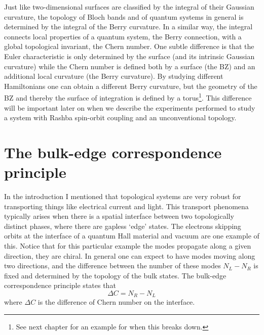 Just like two-dimensional surfaces are classified by the integral of their Gaussian curvature, the topology of Bloch bands and of quantum systems in general is determined by the integral of the Berry curvature. In a similar way, the integral connects local properties of a quantum system, the Berry connection, with a global topological invariant, the Chern number. One subtle difference is that the Euler characteristic is only determined by the surface (and its intrinsic Gaussian curvature) while the Chern number is defined both by a surface (the BZ) and an additional local curvature (the Berry curvature). By studying different Hamiltonians one can obtain a different Berry curvature, but the geometry of the BZ and thereby the surface of integration is defined by a torus\footnote{See next chapter for an example for when this breaks down.}. This difference will be important later on when we describe the experiments performed to study a system with Rashba spin-orbit coupling and an unconventional topology. %


\section{The bulk-edge correspondence principle}

In the introduction I mentioned that topological systems are very robust for transporting things like electrical current and light. This transport phenomena typically arises when there is a spatial interface between two topologically distinct phases, where there are gapless `edge' states. The electrons skipping orbits at the interface of a quantum Hall material and vacuum are one example of this. Notice that for this particular example the modes propagate along a given direction, they are chiral. In general one can expect to have modes moving along two directions, and the difference between the number of these modes $N_L - N_R$ is fixed and determined by the topology of the bulk states. The bulk-edge correspondence principle states that 
%
\begin{equation}
	\Delta C=N_R - N_L
\end{equation}
%
where $\Delta C$ is the difference of Chern number on the interface. 

